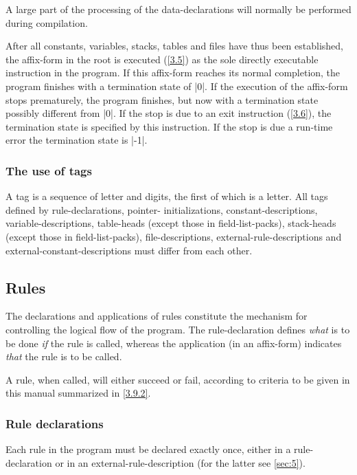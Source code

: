 \documentclass{article}
\newcommand\g[1]{{\sf #1}}
\let\oref\ref
\let\ref\oref
\begin{document}
A large part of the processing of the \g{data-declaration}s will normally be
performed during compilation.

After all constants, variables, stacks, tables and files have thus been
established, the \g{affix-form} in the \g{root} is executed (\ref{3.5}) as the
sole
directly executable instruction in the program. If this \g{affix-form}
reaches its normal completion, the program finishes with a termination state
of \pp|0|. If the execution of the \g{affix-form} stops prematurely, the
program finishes, but now with a termination state possibly different from
\pp|0|. If the stop is due to an \g{exit} instruction (\ref{3.6}), the termination state
is specified by this instruction. If the stop is due a run-time error the
termination state is \pp|-1|.

\subsubsection{The use of \g{tag}s}\label{3.1.2}
A \g{tag} is a sequence of letter and digits, the first of which is a
letter. All \g{tag}s defined by \g{rule-declaration}s, \g{pointer-{}
initialization}s, \g{constant-description}s, \g{variable-description}s,
\g{table-head}s (except those in \g{field-list-pack}s), \g{stack-head}s
(except those in \g{field-list-pack}s), \g{file-description}s, 
\g{external-rule-description}s
and \g{external-constant-description}s must differ from each
other.

\subsection{Rules} \label{3.2}
The declarations and applications of \g{rule}s constitute the mechanism for
controlling the logical flow of the program. The \g{rule-declaration}
defines \emph{what} is to be done \emph{if} the rule is called, whereas
the application (in an \g{affix-form}) indicates \emph{that} the rule is
to be called.

A rule, when called, will either succeed or fail, according to criteria
to be given in this manual summarized in \ref{3.9.2}.

\subsubsection{Rule declarations}\label{3.2.1}

Each rule in the program must be declared exactly once, either in a
\g{rule-declaration} or in an \g{external-rule-description} (for the latter see
\ref{sec:5}).
\end{document}

